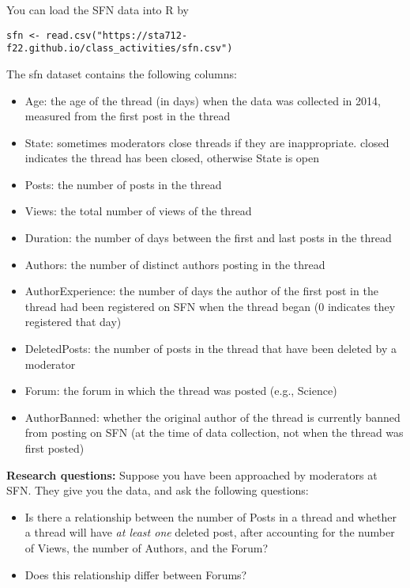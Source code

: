 \documentclass[11pt]{article}
\begin{document}
\noindent You can load the SFN data into R by

\begin{verbatim}
sfn <- read.csv("https://sta712-f22.github.io/class_activities/sfn.csv")
\end{verbatim}

\noindent The sfn dataset contains the following columns:

\begin{itemize}
\item Age: the age of the thread (in days) when the data was collected in 2014, measured from the first post in the thread
\item State: sometimes moderators close threads if they are inappropriate. closed indicates the thread has been closed, otherwise State is open
\item Posts: the number of posts in the thread
\item Views: the total number of views of the thread
\item Duration: the number of days between the first and last posts in the thread
\item Authors: the number of distinct authors posting in the thread
\item AuthorExperience: the number of days the author of the first post in the thread had been registered on SFN when the thread began (0 indicates they registered that day)
\item DeletedPosts: the number of posts in the thread that have been deleted by a moderator
\item Forum: the forum in which the thread was posted (e.g., Science)
\item AuthorBanned: whether the original author of the thread is currently banned from posting on SFN (at the time of data collection, not when the thread was first posted)
\end{itemize}

\noindent \textbf{Research questions:} Suppose you have been approached by moderators at SFN. They give you the data, and ask the following questions:
\begin{itemize}
\item Is there a relationship between the number of Posts in a thread and whether a thread will have \textit{at least one} deleted post, after accounting for the number of Views, the number of Authors, and the Forum?
\item Does this relationship differ between Forums?
\end{itemize}
\end{document}
